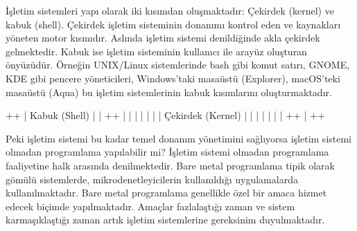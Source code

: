 \documentclass[a4paper,10pt,turkish]{sphinxmanual}
\begin{document}
\sphinxAtStartPar
İşletim sistemleri yapı olarak iki kısımdan oluşmaktadır: Çekirdek (kernel) ve kabuk
(shell). Çekirdek işletim sisteminin donanımı kontrol eden ve kaynakları yöneten motor
kısmıdır. Aslında işletim sistemi denildiğinde akla çekirdek gelmektedir. Kabuk ise
işletim sisteminin kullanıcı ile arayüz oluşturan önyüzüdür. Örneğin UNIX/Linux
sistemlerinde bash gibi komut satırı, GNOME, KDE gibi pencere yöneticileri, Windows’taki
masaüstü (Explorer), macOS’teki masaüstü (Aqua) bu işletim sistemlerinin kabuk kısımlarını
oluşturmaktadır.

\begin{sphinxVerbatim}[commandchars=\\\{\}]
+\PYGZhy{}\PYGZhy{}\PYGZhy{}\PYGZhy{}\PYGZhy{}\PYGZhy{}\PYGZhy{}\PYGZhy{}\PYGZhy{}\PYGZhy{}\PYGZhy{}\PYGZhy{}\PYGZhy{}\PYGZhy{}\PYGZhy{}\PYGZhy{}\PYGZhy{}\PYGZhy{}\PYGZhy{}\PYGZhy{}\PYGZhy{}\PYGZhy{}\PYGZhy{}\PYGZhy{}\PYGZhy{}\PYGZhy{}\PYGZhy{}\PYGZhy{}\PYGZhy{}\PYGZhy{}\PYGZhy{}\PYGZhy{}\PYGZhy{}\PYGZhy{}\PYGZhy{}+
|           Kabuk (Shell)           |
|   +\PYGZhy{}\PYGZhy{}\PYGZhy{}\PYGZhy{}\PYGZhy{}\PYGZhy{}\PYGZhy{}\PYGZhy{}\PYGZhy{}\PYGZhy{}\PYGZhy{}\PYGZhy{}\PYGZhy{}\PYGZhy{}\PYGZhy{}\PYGZhy{}\PYGZhy{}\PYGZhy{}\PYGZhy{}\PYGZhy{}\PYGZhy{}\PYGZhy{}\PYGZhy{}\PYGZhy{}\PYGZhy{}\PYGZhy{}\PYGZhy{}+   |
|   |                           |   |
|   |    Çekirdek (Kernel)      |   |
|   |                           |   |
|   +\PYGZhy{}\PYGZhy{}\PYGZhy{}\PYGZhy{}\PYGZhy{}\PYGZhy{}\PYGZhy{}\PYGZhy{}\PYGZhy{}\PYGZhy{}\PYGZhy{}\PYGZhy{}\PYGZhy{}\PYGZhy{}\PYGZhy{}\PYGZhy{}\PYGZhy{}\PYGZhy{}\PYGZhy{}\PYGZhy{}\PYGZhy{}\PYGZhy{}\PYGZhy{}\PYGZhy{}\PYGZhy{}\PYGZhy{}\PYGZhy{}+   |
+\PYGZhy{}\PYGZhy{}\PYGZhy{}\PYGZhy{}\PYGZhy{}\PYGZhy{}\PYGZhy{}\PYGZhy{}\PYGZhy{}\PYGZhy{}\PYGZhy{}\PYGZhy{}\PYGZhy{}\PYGZhy{}\PYGZhy{}\PYGZhy{}\PYGZhy{}\PYGZhy{}\PYGZhy{}\PYGZhy{}\PYGZhy{}\PYGZhy{}\PYGZhy{}\PYGZhy{}\PYGZhy{}\PYGZhy{}\PYGZhy{}\PYGZhy{}\PYGZhy{}\PYGZhy{}\PYGZhy{}\PYGZhy{}\PYGZhy{}\PYGZhy{}\PYGZhy{}+
\end{sphinxVerbatim}

\sphinxAtStartPar
Peki işletim sistemi bu kadar temel donanım yönetimini sağlıyorsa işletim sistemi olmadan
programlama yapılabilir mi? İşletim sistemi olmadan programlama faaliyetine halk arasında
 denilmektedir. Bare metal programlama tipik olarak gömülü
sistemlerde, mikrodenetleyicilerin kullanıldığı uygulamalarda kullanılmaktadır. Bare metal
programlama genellikle özel bir amaca hizmet edecek biçimde yapılmaktadır. Amaçlar
fazlalaştığı zaman ve sistem karmaşıklaştığı zaman artık işletim sistemlerine gereksinim
duyulmaktadır.
\end{document}
